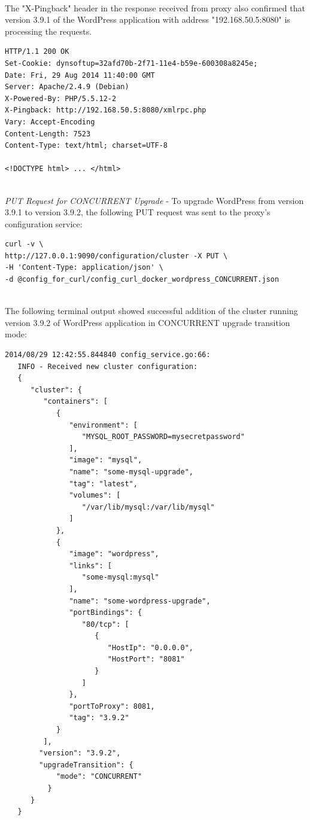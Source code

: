 \documentclass[a4paper,11pt,twoside]{report}
\begin{document}
\noindent\\
The "X-Pingback" header in the response received from proxy also confirmed that version 3.9.1 of the WordPress application with address "192.168.50.5:8080" is processing the requests. \smallskip 

\begin{lstlisting}[language=terminal]
HTTP/1.1 200 OK
Set-Cookie: dynsoftup=32afd70b-2f71-11e4-b59e-600308a8245e;
Date: Fri, 29 Aug 2014 11:40:00 GMT
Server: Apache/2.4.9 (Debian)
X-Powered-By: PHP/5.5.12-2
X-Pingback: http://192.168.50.5:8080/xmlrpc.php
Vary: Accept-Encoding
Content-Length: 7523
Content-Type: text/html; charset=UTF-8
 
<!DOCTYPE html> ... </html>
\end{lstlisting} 

\noindent\\
\textit{PUT Request for CONCURRENT Upgrade} - To upgrade WordPress from version 3.9.1 to version 3.9.2, the following PUT request was sent to the proxy's configuration service: \smallskip

\begin{lstlisting}[language=terminal]
curl -v \
http://127.0.0.1:9090/configuration/cluster -X PUT \
-H 'Content-Type: application/json' \ 
-d @config_for_curl/config_curl_docker_wordpress_CONCURRENT.json
\end{lstlisting}  

\noindent\\
The following terminal output showed successful addition of the cluster running version 3.9.2 of WordPress application in CONCURRENT upgrade transition mode:\smallskip

\begin{lstlisting}[language=terminal]
2014/08/29 12:42:55.844840 config_service.go:66:     
   INFO - Received new cluster configuration:
   {
      "cluster": {
         "containers": [
            {
               "environment": [
                  "MYSQL_ROOT_PASSWORD=mysecretpassword"
               ],
               "image": "mysql",
               "name": "some-mysql-upgrade",
               "tag": "latest",
               "volumes": [
                  "/var/lib/mysql:/var/lib/mysql"
               ]
            },
            {
               "image": "wordpress",
               "links": [
                  "some-mysql:mysql"
               ],
               "name": "some-wordpress-upgrade",
               "portBindings": {
                  "80/tcp": [
                     {
                        "HostIp": "0.0.0.0",
                        "HostPort": "8081"
                     }
                  ]
               },
               "portToProxy": 8081,
               "tag": "3.9.2"
            }
         ],
        "version": "3.9.2", 
        "upgradeTransition": {
            "mode": "CONCURRENT"
          }
      }
   } 
\end{lstlisting} 
\end{document}
